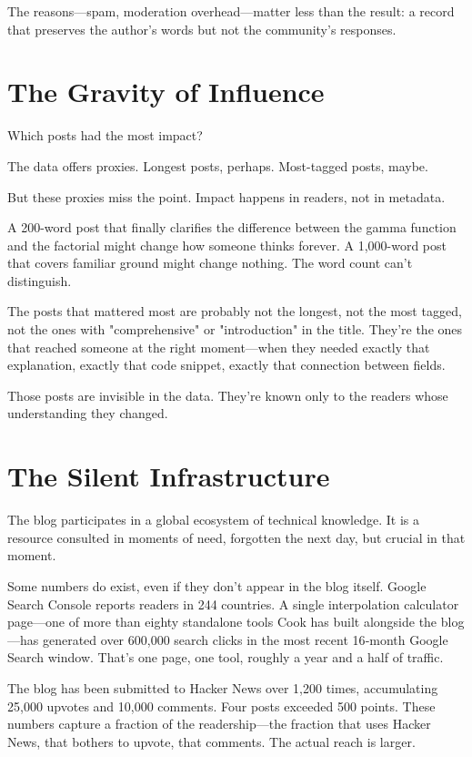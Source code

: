 The reasons—spam, moderation overhead—matter less than the result: a record that preserves the author's words but not the community's responses.

\bigskip

\section*{The Gravity of Influence}

Which posts had the most impact?

The data offers proxies. Longest posts, perhaps. Most-tagged posts, maybe.

But these proxies miss the point. Impact happens in readers, not in metadata.

A 200-word post that finally clarifies the difference between the gamma function and the factorial might change how someone thinks forever. A 1,000-word post that covers familiar ground might change nothing. The word count can't distinguish.

The posts that mattered most are probably not the longest, not the most tagged, not the ones with "comprehensive" or "introduction" in the title. They're the ones that reached someone at the right moment—when they needed exactly that explanation, exactly that code snippet, exactly that connection between fields.

Those posts are invisible in the data. They're known only to the readers whose understanding they changed.

\bigskip

\section*{The Silent Infrastructure}

The blog participates in a global ecosystem of technical knowledge. It is a resource consulted in moments of need, forgotten the next day, but crucial in that moment.

Some numbers do exist, even if they don't appear in the blog itself. Google Search Console reports readers in 244 countries. A single interpolation calculator page—one of more than eighty standalone tools Cook has built alongside the blog—has generated over 600,000 search clicks in the most recent 16‑month Google Search window. That's one page, one tool, roughly a year and a half of traffic.

The blog has been submitted to Hacker News over 1,200 times, accumulating 25,000 upvotes and 10,000 comments. Four posts exceeded 500 points. These numbers capture a fraction of the readership—the fraction that uses Hacker News, that bothers to upvote, that comments. The actual reach is larger.

